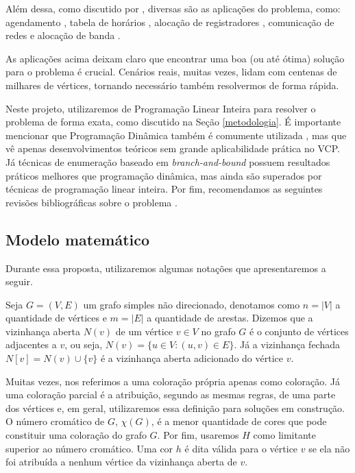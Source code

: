 \documentclass[11pt]{article}
\begin{document}
Além dessa, como discutido por \textcite{Malaguti2010SurveyVertexColoring}, diversas são as aplicações do problema, como: agendamento \autocite{Leighton1979GraphColoringAlgorithm}, tabela de horários \autocite{Werra1985introductiontimetabling}, alocação de registradores \autocite{Chow1990prioritybasedcoloring}, comunicação de redes \autocite{Caprara2007PassengerRailwayOptimization} e alocação de banda \autocite{Gamst1986Somelowerbounds}.

As aplicações acima deixam claro que encontrar uma boa (ou até ótima) solução para o problema é crucial.
Cenários reais, muitas vezes, lidam com centenas de milhares de vértices, tornando necessário também resolvermos de forma rápida.

Neste projeto, utilizaremos de Programação Linear Inteira para resolver o problema de forma exata, como discutido na Seção \ref{metodologia}.
É importante mencionar que Programação Dinâmica também é comumente utilizada \autocites{Eppstein2006SmallMaximalIndependent}[][]{Byskov2002ChromaticNumberTime}, mas que vê apenas desenvolvimentos teóricos sem grande aplicabilidade prática no VCP.
Já técnicas de enumeração baseado em \emph{branch-and-bound} \autocite{Brelaz1979Newmethodscolor} possuem resultados práticos melhores que programação dinâmica, mas ainda são superados por técnicas de programação linear inteira.
Por fim, recomendamos as seguintes revisões bibliográficas sobre o problema \autocites{Malaguti2010SurveyVertexColoring}[][]{Lewis2015GuideGraphColouring}[][]{Husfeldt2015Graphcolouringalgorithms}[][]{Lima2018ExactAlgorithmsGraph}.

\subsection{Modelo matemático}
\label{sec:org582375e}
Durante essa proposta, utilizaremos algumas notações que apresentaremos a seguir.

Seja \(G = (V,E)\) um grafo simples não direcionado, denotamos como \(n = |V|\) a quantidade de vértices e \(m = |E|\) a quantidade de arestas.
Dizemos que a vizinhança aberta \(N(v)\) de um vértice \(v \in V\) no grafo \(G\) é o conjunto de vértices adjacentes a \(v\), ou seja, \(N(v) = \{u \in V : (u,v) \in E\}\).
Já a vizinhança fechada \(N[v] = N(v) \cup \{v\}\) é a vizinhança aberta adicionado do vértice \(v\).

Muitas vezes, nos referimos a uma coloração própria apenas como coloração.
Já uma coloração parcial é a atribuição, segundo as mesmas regras, de uma parte dos vértices e, em geral, utilizaremos essa definição para soluções em construção.
O número cromático de \(G\),  \(\chi(G)\), é a menor quantidade de cores que pode constituir uma coloração do grafo \(G\).
Por fim, usaremos \(H\) como limitante superior ao número cromático.
Uma cor \(h\) é dita válida para o vértice \(v\) se ela não foi atribuída a nenhum vértice da vizinhança aberta de \(v\).
\end{document}
